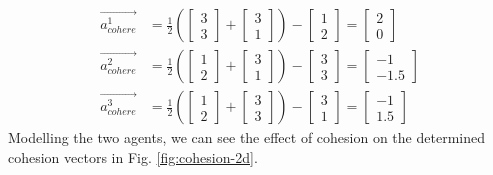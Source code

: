 \documentclass[12pt]{article}
\begin{document}
\begin{equation}
    \begin{aligned}
        \vec{a_{cohere}^1} &= \frac{1}{2} \left( \begin{bmatrix} 3 \\ 3 \end{bmatrix} + \begin{bmatrix} 3 \\ 1 \end{bmatrix} \right) - \begin{bmatrix} 1 \\ 2 \end{bmatrix} = \begin{bmatrix} 2 \\ 0 \end{bmatrix}
        \\
        \vec{a_{cohere}^2} &= \frac{1}{2} \left( \begin{bmatrix} 1 \\ 2 \end{bmatrix} + \begin{bmatrix} 3 \\ 1 \end{bmatrix} \right) - \begin{bmatrix} 3 \\ 3 \end{bmatrix} = \begin{bmatrix} -1 \\ -1.5 \end{bmatrix}
        \\
        \vec{a_{cohere}^3} &= \frac{1}{2} \left( \begin{bmatrix} 1 \\ 2 \end{bmatrix} + \begin{bmatrix} 3 \\ 3 \end{bmatrix} \right) - \begin{bmatrix} 3 \\ 1 \end{bmatrix} = \begin{bmatrix} -1 \\ 1.5 \end{bmatrix}
    \end{aligned}
\end{equation}
Modelling the two agents, we can see the effect of cohesion on the determined cohesion vectors in Fig. \ref{fig:cohesion-2d}. 
\end{document}
